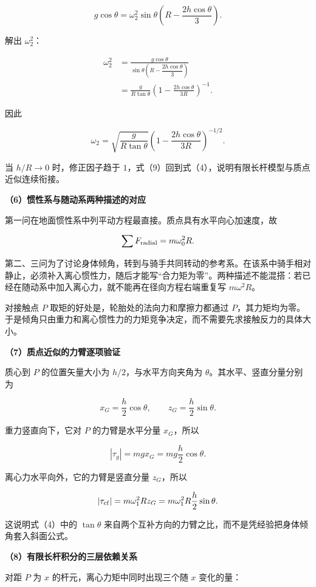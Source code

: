 \documentclass[12pt,a4paper,UTF8]{ctexart}
\begin{document}
\[
g\cos\theta
=\omega_2^2\sin\theta
\left(R-\frac{2h\cos\theta}{3}\right).
\]

解出 \(\omega_2^2\)：

\[
\begin{aligned}
\omega_2^2
&=\frac{g\cos\theta}
{\sin\theta\left(R-\dfrac{2h\cos\theta}{3}\right)}\\
&=\frac{g}{R\tan\theta}
\left(1-\frac{2h\cos\theta}{3R}\right)^{-1}.
\end{aligned}
\]

因此

\[
\boxed{
\omega_2
=\sqrt{\frac{g}{R\tan\theta}}
\left(1-\frac{2h\cos\theta}{3R}\right)^{-1/2}
}.\tag{9}
\]

当 \(h/R\to0\) 时，修正因子趋于
\(1\)，式（9）回到式（4），说明有限长杆模型与质点近似连续衔接。

\textbf{（6）惯性系与随动系两种描述的对应}

第一问在地面惯性系中列平动方程最直接。质点具有水平向心加速度，故

\[
\sum F_{\rm radial}=m\omega_0^2R.
\]

第二、三问为了讨论身体倾角，转到与骑手共同转动的参考系。在该系中骑手相对静止，必须补入离心惯性力，随后才能写``合力矩为零''。两种描述不能混搭：若已经在随动系中加入离心力，就不能再在径向方程右端重复写
\(m\omega^2R\)。

对接触点 \(P\) 取矩的好处是，轮胎处的法向力和摩擦力都通过
\(P\)，其力矩均为零。于是倾角只由重力和离心惯性力的力矩竞争决定，而不需要先求接触反力的具体大小。

\textbf{（7）质点近似的力臂逐项验证}

质心到 \(P\) 的位置矢量大小为 \(h/2\)，与水平方向夹角为
\(\theta\)。其水平、竖直分量分别为

\[
x_G=\frac h2\cos\theta,
\qquad
z_G=\frac h2\sin\theta.
\tag{10}
\]

重力竖直向下，它对 \(P\) 的力臂是水平分量 \(x_G\)，所以

\[
|\tau_g|=mgx_G=mg\frac h2\cos\theta.
\]

离心力水平向外，它的力臂是竖直分量 \(z_G\)，所以

\[
|\tau_{\rm cf}|=m\omega_1^2Rz_G
=m\omega_1^2R\frac h2\sin\theta.
\]

这说明式（4）中的 \(\tan\theta\)
来自两个互补方向的力臂之比，而不是凭经验把身体倾角套入斜面公式。

\textbf{（8）有限长杆积分的三层依赖关系}

对距 \(P\) 为 \(x\) 的杆元，离心力矩中同时出现三个随 \(x\) 变化的量：
\end{document}
